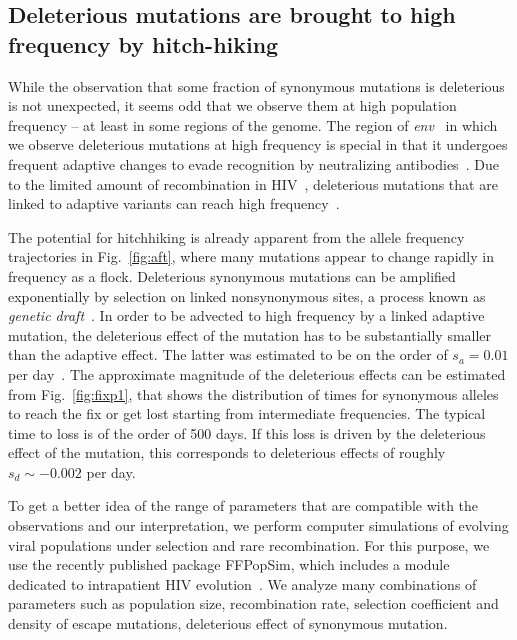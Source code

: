 \documentclass[rmp, twocolumn]{revtex4}
\newcommand{\env}{\textit{env}}
\newcommand{\FIG}[1]{Fig.~\ref{fig:#1}}
\begin{document}
\subsection{Deleterious mutations are brought to high frequency by hitch-hiking}
While the observation that some fraction of synonymous mutations is deleterious
is not unexpected, it seems odd that we observe them at high population
frequency -- at least in some regions of the genome. The region of \env~ in which
we observe deleterious mutations at high frequency is special in that it
undergoes frequent adaptive changes to evade recognition by neutralizing
antibodies~\cite{williamson_adaptation_2003}. Due to the limited amount of
recombination in HIV~\cite{neher_recombination_2010,batorsky_estimate_2011},
deleterious mutations that are linked to adaptive variants can reach high
frequency~\citep{smith_hitch-hiking_1974}.

The potential for hitchhiking is already apparent from the allele frequency
trajectories in \FIG{aft}, where many mutations appear to change rapidly in
frequency as a flock. Deleterious synonymous mutations can be amplified
exponentially by selection on linked nonsynonymous sites, a process known as
{\it genetic draft}~\citep{gillespie_genetic_2000, neher_genetic_2011}. In order
to be advected to high frequency by a linked adaptive mutation, the deleterious
effect of the mutation has to be substantially smaller than the adaptive effect.
The latter was estimated to be on the order of $s_a = 0.01$ per day~\citep{neher_recombination_2010}.
The approximate magnitude of the deleterious effects can be estimated from
\FIG{fixp1}, that shows the distribution of times for synonymous
alleles to reach the fix or get lost starting from intermediate frequencies. The
typical time to loss is of the order of 500 days. If this loss is driven by the
deleterious effect of the mutation, this corresponds to deleterious effects of
roughly $s_d \sim - 0.002$ per day.

To get a better idea of the range of parameters that are compatible with the
observations and our interpretation, we  perform computer simulations of
evolving viral populations under selection and rare recombination. For this
purpose, we use the recently published package FFPopSim, which includes a module
dedicated to intrapatient HIV evolution~\citep{zanini_ffpopsim:_2012}. We
analyze many combinations of parameters such as population size, recombination
rate, selection coefficient and density of escape mutations, deleterious effect
of synonymous mutation.
\end{document}
